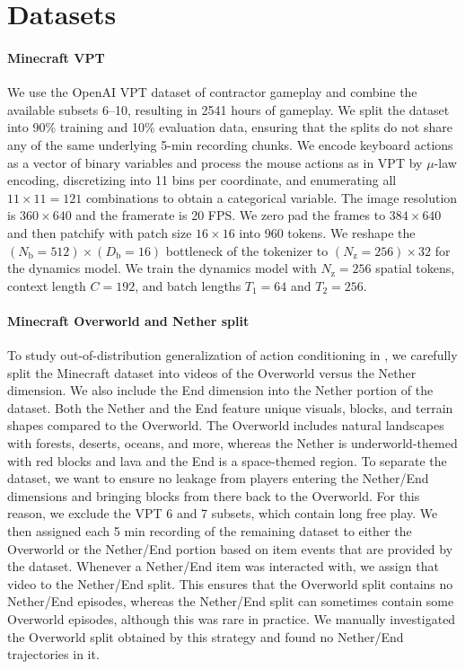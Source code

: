 
\section{Datasets}

\paragraph{Minecraft VPT}

We use the OpenAI VPT dataset of contractor gameplay \citep{vpt} and combine the available subsets 6--10, resulting in 2541 hours of gameplay.
We split the dataset into 90\% training and 10\% evaluation data, ensuring that the splits do not share any of the same underlying 5-min recording chunks.
We encode keyboard actions as a vector of binary variables and process the mouse actions as in VPT by $\mu$-law encoding, discretizing into 11 bins per coordinate, and enumerating all $11 \times 11 = 121$ combinations to obtain a categorical variable.
The image resolution is $360 \times 640$ and the framerate is 20 FPS.
We zero pad the frames to $384 \times 640$ and then patchify with patch size $16 \times 16$ into 960 tokens.
We reshape the $(N_\mathrm{b} = 512) \times (D_\mathrm{b} = 16)$ bottleneck of the tokenizer to $(N_\mathrm{z} = 256) \times 32$ for the dynamics model.
We train the dynamics model with $N_\mathrm{z} = 256$ spatial tokens, context length $C = 192$, and batch lengths $T_1 = 64$ and $T_2 = 256$.

\paragraph{Minecraft Overworld and Nether split}

To study out-of-distribution generalization of action conditioning in \method, we carefully split the Minecraft dataset into videos of the Overworld versus the Nether dimension.
We also include the End dimension into the Nether portion of the dataset.
Both the Nether and the End feature unique visuals, blocks, and terrain shapes compared to the Overworld.
The Overworld includes natural landscapes with forests, deserts, oceans, and more, whereas the Nether is underworld-themed with red blocks and lava and the End is a space-themed region.
To separate the dataset, we want to ensure no leakage from players entering the Nether/End dimensions and bringing blocks from there back to the Overworld.
For this reason, we exclude the VPT 6 and 7 subsets, which contain long free play.
We then assigned each 5 min recording of the remaining dataset to either the Overworld or the Nether/End portion based on item events that are provided by the dataset.
Whenever a Nether/End item was interacted with, we assign that video to the Nether/End split.
This ensures that the Overworld split contains no Nether/End episodes, whereas the Nether/End split can sometimes contain some Overworld episodes, although this was rare in practice.
We manually investigated the Overworld split obtained by this strategy and found no Nether/End trajectories in it.

